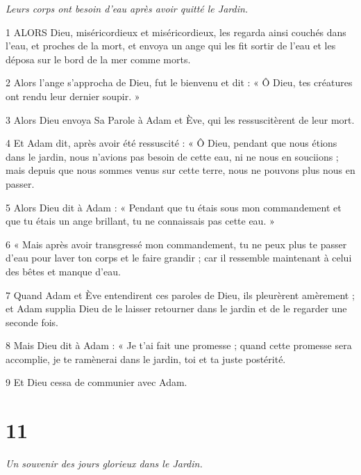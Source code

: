 \par \textit{Leurs corps ont besoin d'eau après avoir quitté le Jardin.}

\par 1 ALORS Dieu, miséricordieux et miséricordieux, les regarda ainsi couchés dans l'eau, et proches de la mort, et envoya un ange qui les fit sortir de l'eau et les déposa sur le bord de la mer comme morts.

\par 2 Alors l'ange s'approcha de Dieu, fut le bienvenu et dit : « Ô Dieu, tes créatures ont rendu leur dernier soupir. »

\par 3 Alors Dieu envoya Sa Parole à Adam et Ève, qui les ressuscitèrent de leur mort.

\par 4 Et Adam dit, après avoir été ressuscité : « Ô Dieu, pendant que nous étions dans le jardin, nous n'avions pas besoin de cette eau, ni ne nous en souciions ; mais depuis que nous sommes venus sur cette terre, nous ne pouvons plus nous en passer.

\par 5 Alors Dieu dit à Adam : « Pendant que tu étais sous mon commandement et que tu étais un ange brillant, tu ne connaissais pas cette eau. »

\par 6 « Mais après avoir transgressé mon commandement, tu ne peux plus te passer d'eau pour laver ton corps et le faire grandir ; car il ressemble maintenant à celui des bêtes et manque d’eau.

\par 7 Quand Adam et Ève entendirent ces paroles de Dieu, ils pleurèrent amèrement ; et Adam supplia Dieu de le laisser retourner dans le jardin et de le regarder une seconde fois.

\par 8 Mais Dieu dit à Adam : « Je t'ai fait une promesse ; quand cette promesse sera accomplie, je te ramènerai dans le jardin, toi et ta juste postérité.

\par 9 Et Dieu cessa de communier avec Adam.

\chapter{11}

\par \textit{Un souvenir des jours glorieux dans le Jardin.}


